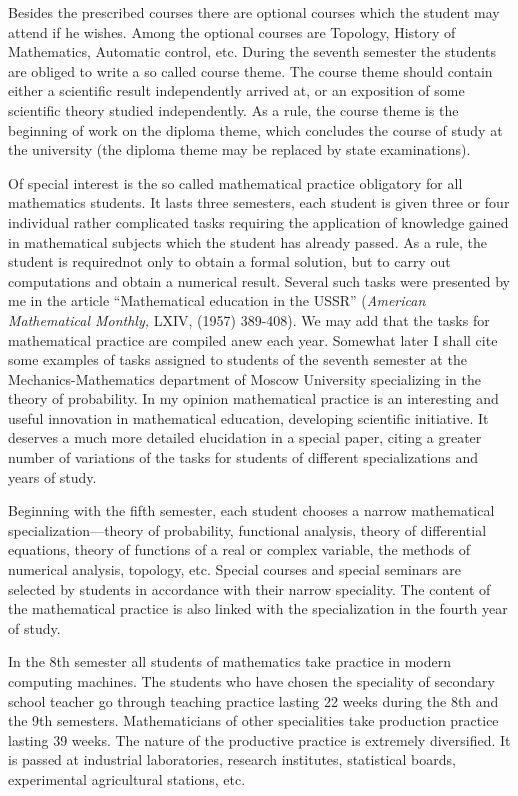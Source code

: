 Besides the prescribed courses there are optional courses which the
student may attend if he wishes. Among the optional courses are
Topology, History of Mathematics, Automatic control, etc. During the
seventh semester the students are obliged to write a so called course
theme. The course theme should contain either a scientific result
independently arrived at, or an exposition of some scientific theory
studied independently. As a rule, the course theme is the beginning of
work on the diploma theme, which concludes the course of study at the
university (the diploma theme may be replaced by state examinations).

Of special interest is the so called mathematical practice obligatory
for all mathematics students. It lasts three semesters, each student
is given three or four individual rather complicated tasks requiring
the application of knowledge gained in mathematical subjects which the
student has already passed. As a rule, the student is
required\pageoriginale not only to obtain a formal solution, but to
carry out computations and obtain a numerical result. Several such
tasks were presented by me in the article ``Mathematical education
in the USSR'' (\textit{American Mathematical Monthly,} LXIV, (1957)
389-408). We may add that the tasks for mathematical practice are
compiled anew each year. Somewhat later I shall cite some examples of
tasks assigned to students of the seventh semester at the
Mechanics-Mathematics department of Moscow University specializing
in the theory of probability. In my opinion mathematical practice is
an interesting and useful innovation in mathematical education,
developing scientific initiative. It deserves a much more detailed
elucidation in a special paper, citing a greater number of variations
of the tasks for students of different specializations and years of
study.

Beginning with the fifth semester, each student chooses a narrow
mathematical specialization---theory of probability, functional
analysis, theory of differential equations, theory of functions of a
real or complex variable, the methods of numerical analysis, topology,
etc. Special courses and special seminars are selected by students in
accordance with their narrow speciality. The content of the
mathematical practice is also linked with the specialization in the
fourth year of study. 

In the 8th semester all students of mathematics take practice in
modern computing machines. The students who have chosen the speciality
of secondary school teacher go through teaching practice lasting 22
weeks during the 8th and the 9th semesters. Mathematicians of other
specialities take production practice lasting 39 weeks. The nature of
the productive practice is extremely diversified. It is passed at
industrial laboratories, research institutes, statistical boards,
experimental agricultural stations, etc. 


